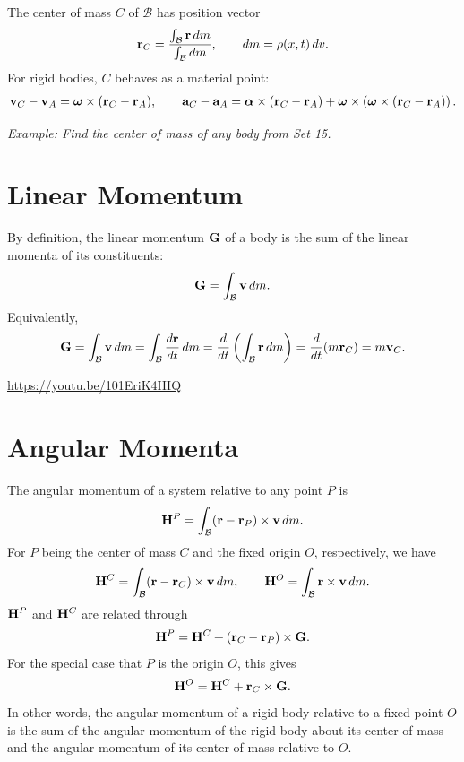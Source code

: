 \documentclass[
  letterpaper,
  DIV=11,
  numbers=noendperiod]{scrreprt}
\newcommand{\lp}{\left(}
\newcommand{\rp}{\right)}
\newcommand{\bomega}{\boldsymbol{\omega}}
\newcommand{\balpha}{\boldsymbol{\alpha}}
\begin{document}
The center of mass \(C\) of \(\mathcal{B}\) has position vector
\begin{align}
    {\bf r}_C = \frac{\int_{\mathcal{B}}{\bf r}\,dm}{\int_{\mathcal{B}}dm}, \qquad dm = \rho(x,t)\,dv.
\end{align} For rigid bodies, \(C\) behaves as a material point:
\begin{align}
    {\bf v}_C-{\bf v}_A = \bomega\times({\bf r}_C-{\bf r}_A), \qquad
    {\bf a}_C-{\bf a}_A = \balpha\times({\bf r}_C-{\bf r}_A)+\bomega\times\lp\bomega\times({\bf r}_C-{\bf r}_A)\rp.
\end{align}

\emph{Example: Find the center of mass of any body from Set 15.}

\section{Linear Momentum}\label{linear-momentum-1}

By definition, the linear momentum \({\bf G}\) of a body is the sum of
the linear momenta of its constituents: \begin{align}
    {\bf G} = \int_{\mathcal{B}}{\bf v}\,dm.
\end{align} Equivalently, \begin{align}
    {\bf G} = \int_{\mathcal{B}}{\bf v}\,dm = \int_{\mathcal{B}}\frac{d{\bf r}}{dt}\,dm = \frac{d}{dt}\left(\int_{\mathcal{B}}{\bf r}\,dm\right) = \frac{d}{dt}(m{\bf r}_C) = m{\bf v}_C.
\end{align}

\url{https://youtu.be/101EriK4HIQ}

\section{Angular Momenta}\label{angular-momenta}

The angular momentum of a system relative to any point \(P\) is
\begin{align}
    {\bf H}^P = \int_{\mathcal{B}}({\bf r}-{\bf r}_P)\times{\bf v}\,dm.
\end{align} For \(P\) being the center of mass \(C\) and the fixed
origin \(O\), respectively, we have \begin{align}
    {\bf H}^C = \int_{\mathcal{B}}({\bf r}-{\bf r}_C)\times{\bf v}\,dm, \qquad {\bf H}^O = \int_{\mathcal{B}}{\bf r}\times{\bf v}\,dm.
\end{align} \({\bf H}^P\) and \({\bf H}^C\) are related through
\begin{align}
    {\bf H}^P = {\bf H}^C+({\bf r}_C-{\bf r}_P)\times{\bf G}.
\end{align} For the special case that \(P\) is the origin \(O\), this
gives \begin{align}
    {\bf H}^O = {\bf H}^C+{\bf r}_C\times{\bf G}.
\end{align} In other words, the angular momentum of a rigid body
relative to a fixed point \(O\) is the sum of the angular momentum of
the rigid body about its center of mass and the angular momentum of its
center of mass relative to \(O\).
\end{document}
